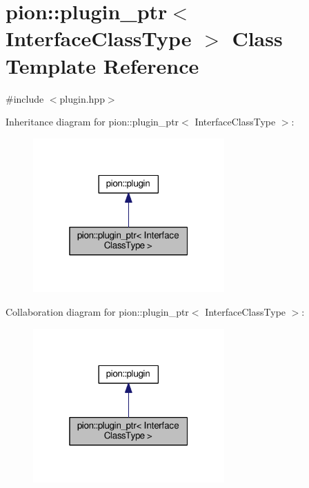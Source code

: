 \hypertarget{classpion_1_1plugin__ptr}{\section{pion\-:\-:plugin\-\_\-ptr$<$ Interface\-Class\-Type $>$ Class Template Reference}
\label{classpion_1_1plugin__ptr}
}


{\ttfamily \#include $<$plugin.\-hpp$>$}



Inheritance diagram for pion\-:\-:plugin\-\_\-ptr$<$ Interface\-Class\-Type $>$\-:
\nopagebreak
\begin{figure}[H]
\begin{center}
\leavevmode
\includegraphics[width=208pt]{classpion_1_1plugin__ptr__inherit__graph}
\end{center}
\end{figure}


Collaboration diagram for pion\-:\-:plugin\-\_\-ptr$<$ Interface\-Class\-Type $>$\-:
\nopagebreak
\begin{figure}[H]
\begin{center}
\leavevmode
\includegraphics[width=208pt]{classpion_1_1plugin__ptr__coll__graph}
\end{center}
\end{figure}
